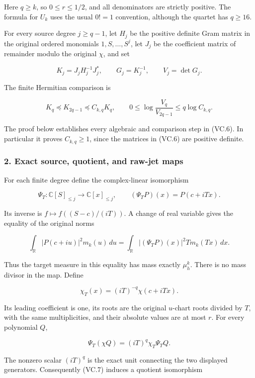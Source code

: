 Here \(q\ge k\), so \(0\le r\le1/2\), and all denominators are strictly positive. The formula for \(U_k\) uses the usual \(0!=1\) convention, although the quartet has \(q\ge16\).

For every source degree \(j\ge q-1\), let \(H_j\) be the positive definite Gram matrix in the original ordered monomials \(1,S,\ldots,S^j\), let \(J_j\) be the coefficient matrix of remainder modulo the original \(\chi\), and set

\[
 K_j=J_jH_j^{-1}J_j^*,\qquad G_j=K_j^{-1},\qquad V_j=\det G_j.
\tag{VC.5}
\]

The finite Hermitian comparison is

\[
 \boxed{K_q\preceq K_{2q-1}\preceq C_{k,q}K_q,\qquad
 0\le\log\frac{V_q}{V_{2q-1}}\le q\log C_{k,q}.}
\tag{VC.6}
\]

The proof below establishes every algebraic and comparison step in (VC.6). In particular it proves \(C_{k,q}\ge1\), since the matrices in (VC.6) are positive definite.

\subsubsection{2. Exact source, quotient, and raw-jet maps}\label{endpoint-volume_connection_original--exact-source-quotient-and-raw-jet-maps}

For each finite degree define the complex-linear isomorphism

\[
 \Psi_T:\mathbb C[S]_{\le j}\longrightarrow\mathbb C[x]_{\le j},
 \qquad (\Psi_TP)(x)=P(c+iTx).
\tag{VC.7}
\]

Its inverse is \(f\mapsto f((S-c)/(iT))\). A change of real variable gives the equality of the original norms

\[
 \int_{\mathbb R}|P(c+iu)|^2m_k(u)\,du
 =\int_{\mathbb R}|(\Psi_TP)(x)|^2T m_k(Tx)\,dx.
\tag{VC.8}
\]

Thus the target measure in this equality has mass exactly \(\mu_h^k\). There is no mass divisor in the map. Define

\[
 \chi_T(x)=(iT)^{-q}\chi(c+iTx).
\tag{VC.9}
\]

Its leading coefficient is one, its roots are the original \(u\)-chart roots divided by \(T\), with the same multiplicities, and their absolute values are at most \(r\). For every polynomial \(Q\),

\[
 \Psi_T(\chi Q)=(iT)^q\chi_T\Psi_TQ.
\tag{VC.10}
\]

The nonzero scalar \((iT)^q\) is the exact unit connecting the two displayed generators. Consequently (VC.7) induces a quotient isomorphism

